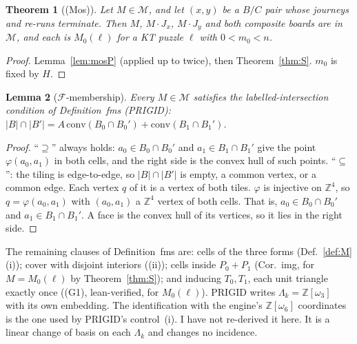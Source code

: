 \documentclass[11pt]{article}
\newtheorem{theorem}{Theorem}\newtheorem{lemma}[theorem]{Lemma}\newtheorem{proposition}[theorem]{Proposition}
\theoremstyle{definition}\newtheorem{definition}[theorem]{Definition}\newtheorem{remark}[theorem]{Remark}
\newcommand{\Z}{\mathbb Z}\newcommand{\R}{\mathbb R}
\newcommand{\M}{\mathcal M}\newcommand{\F}{\mathcal F}
\begin{document}
\begin{theorem}[(Mos)]\label{thm:mos}
Let $M\in\M$, and let $(x,y)$ be a $B/C$ pair whose journeys and re-runs terminate. Then $M$, $M\cdot J_x$, $M\cdot J_y$ and both composite boards are in $\M$, and each is $M_0(\ell)$ for a KT puzzle $\ell$ with $0<m_0<n$.
\end{theorem}
\begin{proof}
Lemma~\ref{lem:mosP} (applied up to twice), then Theorem~\ref{thm:S}. $m_0$ is fixed by $H$.
\end{proof}

\begin{lemma}[$\F$-membership]\label{lem:F}
Every $M\in\M$ satisfies the labelled-intersection condition of Definition~fms (PRIGID): $|B|\cap|B'|=A\,\mathrm{conv}(B_0\cap B_0')+\mathrm{conv}(B_1\cap B_1')$.
\end{lemma}
\begin{proof}
``$\supseteq$'' always holds: $a_0\in B_0\cap B_0'$ and $a_1\in B_1\cap B_1'$ give the point $\varphi(a_0,a_1)$ in both cells, and the right side is the convex hull of such points. ``$\subseteq$'': the tiling is edge-to-edge, so $|B|\cap|B'|$ is empty, a common vertex, or a common edge. Each vertex $q$ of it is a vertex of both tiles. $\varphi$ is injective on $\Z^4$, so $q=\varphi(a_0,a_1)$ with $(a_0,a_1)$ a $\Z^4$ vertex of both cells. That is, $a_0\in B_0\cap B_0'$ and $a_1\in B_1\cap B_1'$. A face is the convex hull of its vertices, so it lies in the right side.
\end{proof}
\noindent The remaining clauses of Definition~fms are: cells of the three forms (Def.~\ref{def:M}(i)); cover with disjoint interiors ((ii)); cells inside $P_0+P_1$ (Cor.~img, for $M=M_0(\ell)$ by Theorem~\ref{thm:S}); and inducing $T_0,T_1$, each unit triangle exactly once ((G1), lean-verified, for $M_0(\ell)$). PRIGID writes $\Lambda_k=\Z[\omega_3]$ with its own embedding. The identification with the engine's $\Z[\omega_6]$ coordinates is the one used by PRIGID's control~(i). I have not re-derived it here. It is a linear change of basis on each $\Lambda_k$ and changes no incidence.
\end{document}
